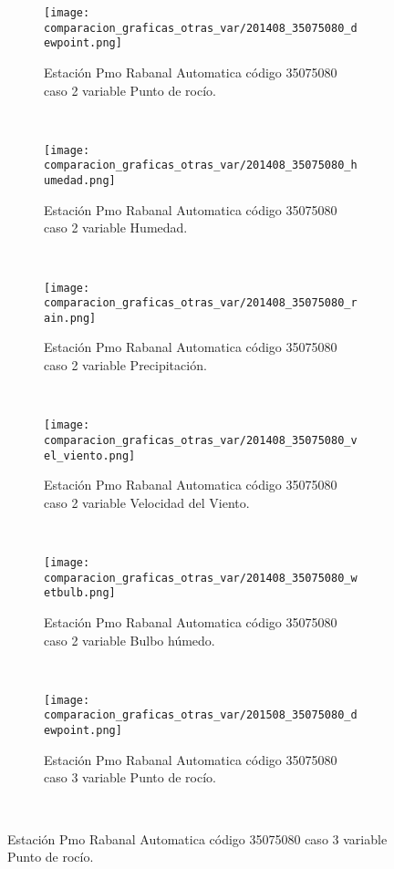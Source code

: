 \begin{figure}[H]
\centering
\begin{subfigure}[normla]{0.4\textwidth}
\caption{Estación Pmo Rabanal Automatica  código 35075080 caso 2 variable Punto de rocío.}
\texttt{[image: comparacion\_graficas\_otras\_var/201408\_35075080\_dewpoint.png]}
\end{subfigure}
~
\begin{subfigure}[normla]{0.4\textwidth}
\caption{Estación Pmo Rabanal Automatica  código 35075080 caso 2 variable Humedad.}
\texttt{[image: comparacion\_graficas\_otras\_var/201408\_35075080\_humedad.png]}
\end{subfigure}
~
\begin{subfigure}[normla]{0.4\textwidth}
\caption{Estación Pmo Rabanal Automatica  código 35075080 caso 2 variable Precipitación.}
\texttt{[image: comparacion\_graficas\_otras\_var/201408\_35075080\_rain.png]}
\end{subfigure}
~
\begin{subfigure}[normla]{0.4\textwidth}
\caption{Estación Pmo Rabanal Automatica  código 35075080 caso 2 variable Velocidad del Viento.}
\texttt{[image: comparacion\_graficas\_otras\_var/201408\_35075080\_vel\_viento.png]}
\end{subfigure}
~
\begin{subfigure}[normla]{0.4\textwidth}
\caption{Estación Pmo Rabanal Automatica  código 35075080 caso 2 variable Bulbo húmedo.}
\texttt{[image: comparacion\_graficas\_otras\_var/201408\_35075080\_wetbulb.png]}
\end{subfigure}
~
\begin{subfigure}[normla]{0.4\textwidth}
\caption{Estación Pmo Rabanal Automatica  código 35075080 caso 3 variable Punto de rocío.}
\texttt{[image: comparacion\_graficas\_otras\_var/201508\_35075080\_dewpoint.png]}
\end{subfigure}
~
\end{figure}
           
